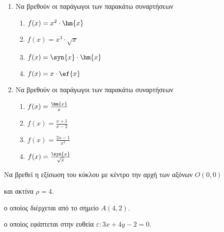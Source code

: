 \begin{enumerate}
\item 
Να βρεθούν οι παράγωγοι των παρακάτω συναρτήσεων
\begin{enumerate}
\item $ f(x)=x^2\cdot\hm{x} $
\item $ f(x)=x^3\cdot\sqrt{x} $
\item $ f(x)=\syn{x}\cdot\hm{x} $
\item $ f(x)=x\cdot\ef{x} $
\end{enumerate}
\item 
Να βρεθούν οι παράγωγοι των παρακάτω συναρτήσεων
\begin{enumerate}
\item $ f(x)=\frac{\hm{x}}{x} $
\item $ f(x)=\frac{x+1}{x-2} $
\item $ f(x)=\frac{2x-1}{x^2} $
\item $ f(x)=\frac{\syn{x}}{\sqrt{x}} $
\end{enumerate}
\end{enumerate}

Να βρεθεί η εξίσωση του κύκλου με κέντρο την αρχή των αξόνων $ O(0,0) $ 
\begin{alist}
\item και ακτίνα $ \rho=4 $.
\item ο οποίος διέρχεται από το σημείο $ A(4,2) $.
\item ο οποίος εφάπτεται στην ευθεία $ \varepsilon : 3x+4y-2=0 $.
\end{alist}

